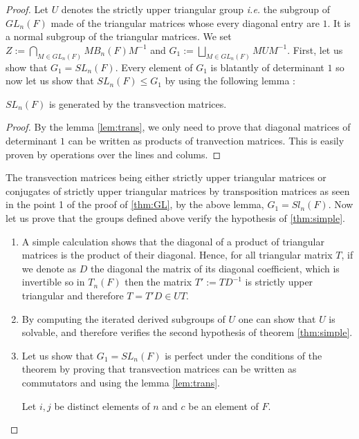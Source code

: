\begin{proof}
    Let $U$ denotes the strictly upper triangular group \textit{i.e.} the subgroup of $GL_n(F)$ made of the triangular matrices whose every diagonal entry are $1$. It is a normal subgroup of the triangular matrices. 
    We set $Z := \bigcap_{M \in GL_n(F)} M B_n(F) M^{-1}$ and $G_1 := \bigsqcup_{M \in GL_n(F)} M U M^{-1}$. 
    First, let us show that $G_1 = SL_n\left( F \right)$. Every element of $G_1$ is blatantly of determinant $1$ so now let us show that $SL_n\left( F \right) \le G_1$ by using the following lemma :
    \begin{lemme}
        $SL_n\left( F \right)$ is generated by the transvection matrices.
    \end{lemme}

    \begin{proof}
        By the lemma \ref{lem:trans}, we only need to prove that diagonal matrices of determinant $1$ can be written as products of tranvection matrices. This is easily proven by operations over the lines and colums.
    \end{proof}
    The transvection matrices being either strictly upper triangular matrices or conjugates of strictly upper triangular matrices by transposition matrices as seen in the point 1 of the proof of \ref{thm:GL}, by the above lemma, $G_1 = Sl_n(F)$.
    Now let us prove that the groups defined above verify the hypothesis of \ref{thm:simple}.

    \begin{enumerate}
        \item A simple calculation shows that the diagonal of a product of triangular matrices is the product of their diagonal. Hence, for all triangular matrix $T$, if we denote as $D$ the diagonal the matrix of its diagonal coefficient, which is invertible so in $T_n\left( F \right)$ then the matrix $T' := TD^{-1}$ is strictly upper triangular and therefore $T = T' D \in UT$.
        \item By computing the iterated derived subgroups of $U$ one can show that $U$ is solvable, and therefore verifies the second hypothesis of theorem \ref{thm:simple}.
        \item Let us show that $G_1 = SL_n\left( F \right)$ is perfect under the conditions of the theorem by proving that transvection matrices can be written as commutators and using the lemma \ref{lem:trans}.

            Let $i,j$ be distinct elements of $n$ and $c$ be an element of $F$.


\end{enumerate}
\end{proof}
